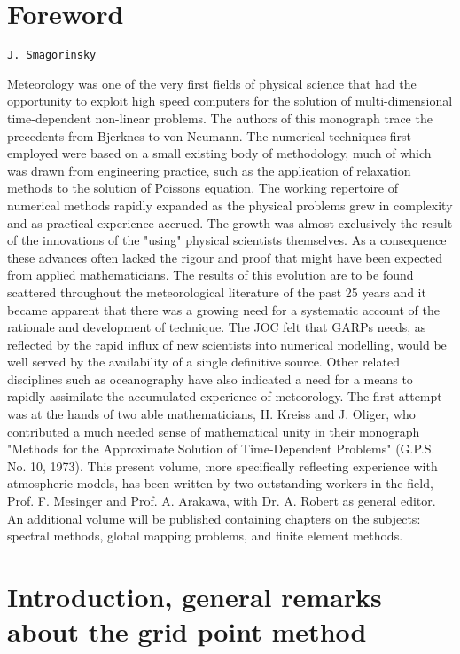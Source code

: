 \section{Foreword}\label{foreword}

\texttt{J.\ Smagorinsky}

Meteorology was one of the very first fields of physical science that
had the opportunity to exploit high speed computers for the solution of
multi-dimensional time-dependent non-linear problems. The authors of
this monograph trace the precedents from Bjerknes to von Neumann. The
numerical techniques first employed were based on a small existing body
of methodology, much of which was drawn from engineering practice, such
as the application of relaxation methods to the solution of
Poisson\textquotesingle s equation. The working repertoire of numerical
methods rapidly expanded as the physical problems grew in complexity and
as practical experience accrued. The growth was almost exclusively the
result of the innovations of the "using" physical scientists themselves.
As a consequence these advances often lacked the rigour and proof that
might have been expected from applied mathematicians. The results of
this evolution are to be found scattered throughout the meteorological
literature of the past 25 years and it became apparent that there was a
growing need for a systematic account of the rationale and development
of technique. The JOC felt that GARP\textquotesingle s needs, as
reflected by the rapid influx of new scientists into numerical
modelling, would be well served by the availability of a single
definitive source. Other related disciplines such as oceanography have
also indicated a need for a means to rapidly assimilate the accumulated
experience of meteorology. The first attempt was at the hands of two
able mathematicians, H. Kreiss and J. Oliger, who contributed a much
needed sense of mathematical unity in their monograph "Methods for the
Approximate Solution of Time-Dependent Problems" (G.P.S. No. 10, 1973).
This present volume, more specifically reflecting experience with
atmospheric models, has been written by two outstanding workers in the
field, Prof. F. Mesinger and Prof. A. Arakawa, with Dr. A. Robert as
general editor. An additional volume will be published containing
chapters on the subjects: spectral methods, global mapping problems, and
finite element methods.

\section{Introduction, general remarks about the grid point
method}\label{Chapter1}

